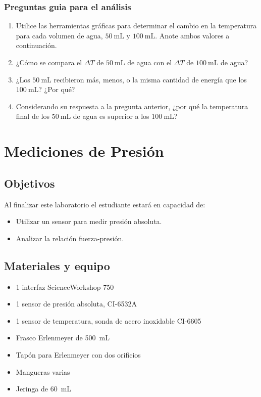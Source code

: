 \documentclass[12pt,letterpaper]{report}
\newcommand{\obj}{Objetivos}
\newcommand{\mat}{Materiales y equipo}
\newcommand{\capacidad}{Al finalizar este laboratorio el estudiante estará en capacidad de:}
\begin{document}
\subsection{Preguntas guia para el análisis}
\begin{enumerate}
    \item Utilice las herramientas gráficas para determinar el cambio en la temperatura para cada volumen de agua, $\SI{50}{\milli\liter}$ y $\SI{100}{\milli\liter}$. Anote ambos valores a continuación.
    \item ¿Cómo se compara el $\Delta T$ de $\SI{50}{\milli\liter}$ de agua con el $\Delta T$ de $\SI{100}{\milli\liter}$ de agua?
    \item ¿Los $\SI{50}{\milli\liter}$ recibieron más, menos, o la misma cantidad de energía que los $\SI{100}{\milli\liter}$? ¿Por qué?
    \item Considerando su respuesta a la pregunta anterior, ¿por qué la temperatura final de los $\SI{50}{\milli\liter}$ de agua es superior a los $\SI{100}{\milli\liter}$?
\end{enumerate}



\chapter{Mediciones de Presión}
\section{\obj}
\capacidad
\begin{itemize}
\item Utilizar un sensor para medir presión absoluta.
\item Analizar la relación fuerza-presión.
\end{itemize}

\section{\mat}
\begin{itemize}
\item 1 interfaz ScienceWorkshop\,\textregistered\,750
\item 1 sensor de presión absoluta, CI-6532A
\item 1 sensor de temperatura, sonda de acero inoxidable CI-6605
\item Frasco Erlenmeyer de \SI{500}{\milli\liter}
\item Tapón para Erlenmeyer con dos orificios
\item Mangueras varias
\item Jeringa de \SI{60}{\milli\liter}
\end{itemize}
\end{document}

